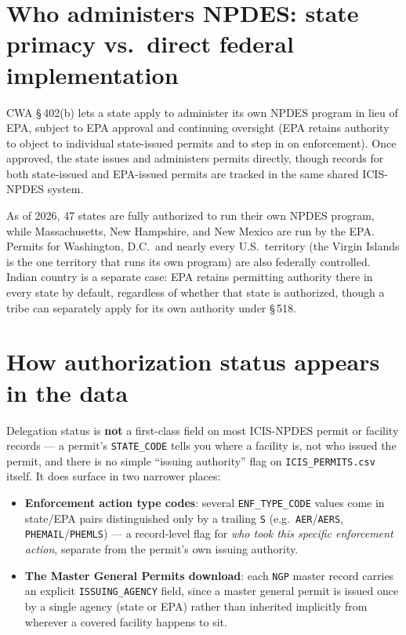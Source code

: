 \documentclass[11pt]{article}
\begin{document}
\section{Who administers NPDES: state primacy vs.\ direct federal implementation}
\label{sec:delegation}

CWA \S\,402(b) lets a state apply to administer its own NPDES program in lieu of EPA,
subject to EPA approval and continuing oversight (EPA retains authority to object to
individual state-issued permits and to step in on enforcement). Once approved, the
state issues and administers permits directly, though records for both state-issued
and EPA-issued permits are tracked in the same shared ICIS-NPDES system.

As of 2026, 47 states are fully authorized to run their own NPDES program, while
Massachusetts, New Hampshire, and New Mexico are run by the EPA. Permits for
Washington, D.C.\ and nearly every U.S.\ territory (the Virgin Islands is the one
territory that runs its own program) are also federally controlled. Indian country is
a separate case: EPA retains permitting authority there in every state by default,
regardless of whether that state is authorized, though a tribe can separately apply
for its own authority under \S\,518.

\section{How authorization status appears in the data}

Delegation status is \textbf{not} a first-class field on most ICIS-NPDES permit or
facility records --- a permit's \texttt{STATE\_CODE} tells you where a facility is, not
who issued the permit, and there is no simple ``issuing authority'' flag on
\texttt{ICIS\_PERMITS.csv} itself. It does surface in two narrower places:

\begin{itemize}
  \item \textbf{Enforcement action type codes}: several \texttt{ENF\_TYPE\_CODE}
        values come in state/EPA pairs distinguished only by a trailing \texttt{S}
        (e.g.\ \texttt{AER}/\texttt{AERS}, \texttt{PHEMAIL}/\texttt{PHEMLS}) --- a
        record-level flag for \textit{who took this specific enforcement action},
        separate from the permit's own issuing authority.
  \item \textbf{The Master General Permits download}: each \texttt{NGP} master record
        carries an explicit \texttt{ISSUING\_AGENCY} field, since a master general
        permit is issued once by a single agency (state or EPA) rather than inherited
        implicitly from wherever a covered facility happens to sit.
\end{itemize}
\end{document}
